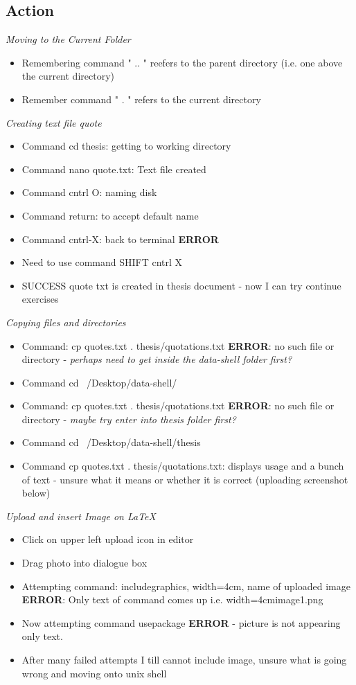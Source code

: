 \documentclass{article}
\begin{document}
\subsection{Action}
\textit{Moving to the Current Folder}
\begin{itemize}
\item Remembering command " .. " reefers to the parent directory (i.e. one above the current directory)
\item Remember command " . " refers to the current directory
\end{itemize}
\textit{Creating text file quote}
\begin{itemize}
\item Command cd thesis: getting to working directory
\item Command nano quote.txt: Text file created 
\item Command cntrl O: naming disk
\item Command return: to accept default name
\item Command cntrl-X: back to terminal \textbf{ERROR}
\item Need to use command SHIFT cntrl X 
\item  SUCCESS quote txt is created in thesis document - now I can try continue exercises
\end{itemize}
\textit{Copying files and directories}
\begin{itemize}
\item Command: cp quotes.txt . thesis/quotations.txt \textbf{ERROR}: no such file or directory - \textit{perhaps need to get inside the data-shell folder first?}
\item Command cd ~/Desktop/data-shell/
\item Command: cp quotes.txt . thesis/quotations.txt \textbf{ERROR}: no such file or directory - \textit{maybe try enter into thesis folder first?}
\item Command cd ~/Desktop/data-shell/thesis
\item Command cp quotes.txt . thesis/quotations.txt: displays usage and a bunch of text - unsure what it means or whether it is correct (uploading screenshot below)
\end{itemize}
\textit{Upload and insert Image on LaTeX}
\begin{itemize}
\item Click on upper left upload icon in editor
\item Drag photo into dialogue box
\item Attempting command: includegraphics, width=4cm,  name of uploaded image \textbf{ERROR}: Only text of command comes up i.e. width=4cmimage1.png
\item Now attempting command usepackage \textbf{ERROR} - picture is not appearing only text.
\item After many failed attempts I till cannot include image, unsure what is going wrong and moving onto unix shell
\end{itemize}
\end{document}
